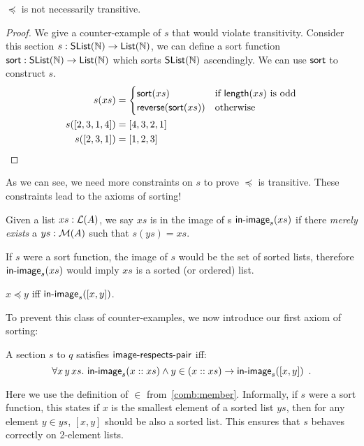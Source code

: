 \begin{proposition}
    $\preccurlyeq$ is not necessarily transitive.
\end{proposition}
\begin{proof}
    We give a counter-example of $s$ that would violate transitivity.
    Consider this section $s : \operatorname{\mathsf{SList}}(\mathbb{N}) \to \operatorname{\mathsf{List}}(\mathbb{N})$, we can define a sort function
    $\operatorname{\mathsf{sort}} : \operatorname{\mathsf{SList}}(\mathbb{N}) \to \operatorname{\mathsf{List}}(\mathbb{N})$ which sorts $\operatorname{\mathsf{SList}}(\mathbb{N})$ ascendingly. We can use $\operatorname{\mathsf{sort}}$
    to construct $s$.
    \begin{align*}
        s(xs)        & = \begin{cases}
                             \operatorname{\mathsf{sort}}(xs)                 & \text{if $\operatorname{\mathsf{length}}(xs)$ is odd} \\
                             \operatorname{\mathsf{reverse}}(\operatorname{\mathsf{sort}}(xs)) & \text{otherwise}
                         \end{cases} \\
        s([2,3,1,4]) & = [4,3,2,1]                                                                     \\
        s([2,3,1])   & = [1,2,3]
    \end{align*}
\end{proof}
As we can see, we need more constraints on $s$ to prove $\preccurlyeq$ is transitive.
These constraints lead to the axioms of sorting!
\begin{definition}
    Given a list $xs : \mathcal{L}(A)$, we say $xs$ is in the image of s $\operatorname{\mathsf{in-image}}_s(xs)$ if there \emph{merely exists}
    a $ys : \mathcal{M}(A)$ such that $s(ys) = xs$.
\end{definition}

If $s$ were a sort function, the image of $s$ would be the set of sorted lists, therefore
$\operatorname{\mathsf{in-image}}_s(xs)$ would imply $xs$ is a sorted (or ordered) list.

\begin{proposition}\label{sort:sort-to-order}
    $x \preccurlyeq y$ \; iff \; $\operatorname{\mathsf{in-image}}_s([x, y])$.
\end{proposition}

\noindent
To prevent this class of counter-examples, we now introduce our first axiom of sorting:
\begin{definition}\label{sort:head-least}
    A section $s$ to $q$ satisfies $\operatorname{\mathsf{image-respects-pair}}$ iff:
    \[
        \forall x\, y\, xs.\, \operatorname{\mathsf{in-image}}_s(x :: xs) \land y \in (x :: xs) \to \operatorname{\mathsf{in-image}}_s([x,y])
        \enspace .
    \]
\end{definition}
Here we use the definition of $\in$ from~\cref{comb:member}. Informally,
if $s$ were a sort function, this states if
$x$ is the smallest element of a sorted list $ys$, then for any element $y \in ys$,
$[x, y]$ should be also a sorted list.
%
This ensures that $s$ behaves correctly on 2-element lists.

